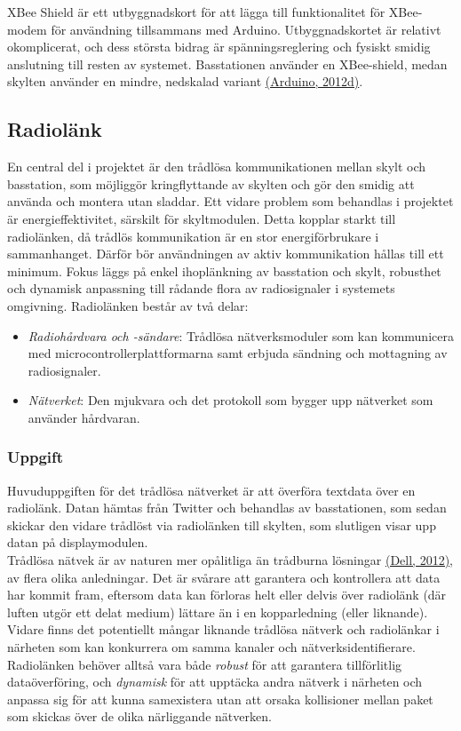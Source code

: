 \documentclass[a4paper,11pt]{article}
\begin{document}
XBee Shield är ett utbyggnadskort för att lägga till funktionalitet för XBee-modem för användning tillsammans med Arduino. Utbyggnadskortet är relativt okomplicerat, och dess största bidrag är spänningsreglering och fysiskt smidig anslutning till resten av systemet. Basstationen använder en XBee-shield, medan skylten använder en mindre, nedskalad variant \hyperref[arduino]{(Arduino, 2012d)}.

\subsection{Radiolänk}
En central del i projektet är den trådlösa kommunikationen mellan skylt och basstation, som möjliggör kringflyttande av skylten och gör den smidig att använda och montera utan sladdar. Ett vidare problem som behandlas i projektet är energieffektivitet, särskilt för skyltmodulen. Detta kopplar starkt till radiolänken, då trådlös kommunikation är en stor energiförbrukare i sammanhanget. Därför bör användningen av aktiv kommunikation hållas till ett minimum. Fokus läggs på enkel ihoplänkning av basstation och skylt, robusthet och dynamisk anpassning till rådande flora av radiosignaler i systemets omgivning. Radiolänken består av två delar:
	
	\begin{itemize}
	\item {\it Radiohårdvara och -sändare}: Trådlösa nätverksmoduler som kan kommunicera med microcontrollerplattformarna samt erbjuda sändning och mottagning av radiosignaler.
    	\item {\it Nätverket}: Den mjukvara och det protokoll som bygger upp nätverket som använder hårdvaran.
	\end{itemize}
	
\subsubsection{Uppgift}
Huvuduppgiften för det trådlösa nätverket är att överföra textdata över en radiolänk. Datan hämtas från Twitter och behandlas av basstationen, som sedan skickar den vidare trådlöst via radiolänken till skylten, som slutligen visar upp datan på displaymodulen. \\

Trådlösa nätvek är av naturen mer opålitliga än trådburna lösningar \hyperref[dell]{(Dell, 2012)}, av flera olika anledningar. Det är svårare att garantera och kontrollera att data har kommit fram, eftersom data kan förloras helt eller delvis över radiolänk (där luften utgör ett delat medium) lättare än i en kopparledning (eller liknande). Vidare finns det potentiellt mångar liknande trådlösa nätverk och radiolänkar i närheten som kan konkurrera om samma kanaler och nätverksidentifierare. Radiolänken behöver alltså vara både {\it robust} för att garantera tillförlitlig dataöverföring, och {\it dynamisk} för att upptäcka andra nätverk i närheten och anpassa sig för att kunna samexistera utan att orsaka kollisioner mellan paket som skickas över de olika närliggande nätverken. \\
\end{document}
